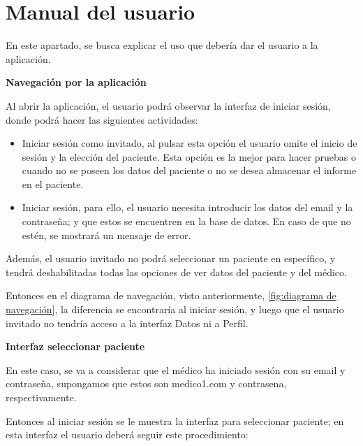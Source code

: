 \section{Manual del usuario}

En este apartado, se busca explicar el uso que debería dar el usuario a la aplicación.

\textbf{Navegación por la aplicación}

Al abrir la aplicación, el usuario podrá observar la interfaz de iniciar sesión, donde podrá hacer las siguientes actividades:
\begin{itemize}
    \item Iniciar sesión como invitado, al pulsar esta opción el usuario omite el inicio de sesión y la elección del paciente. Esta opción es la mejor para hacer pruebas o cuando no se poseen los datos del paciente o no se desea almacenar el informe en el paciente.

    \item Iniciar sesión, para ello, el usuario necesita introducir los datos del email y la contraseña; y que estos se encuentren en la base de datos. En caso de que no estén, se mostrará un mensaje de error.

\end{itemize}

Además, el usuario invitado no podrá seleccionar un paciente en específico, y tendrá deshabilitadas todas las opciones de ver datos del paciente y del médico.

Entonces en el diagrama de navegación, visto anteriormente, \ref{fig:diagrama de navegación}, la diferencia se encontraría al iniciar sesión, y luego que el usuario invitado no tendría acceso a la interfaz Datos ni a Perfil.


\textbf{Interfaz seleccionar paciente}

En este caso, se va a considerar que el médico ha iniciado sesión con su email y contraseña, supongamos que estos son medico1\@gmail.com y contrasena, respectivamente.

Entonces al iniciar sesión se le muestra la interfaz para seleccionar paciente; en esta interfaz el usuario deberá seguir este procedimiento:

